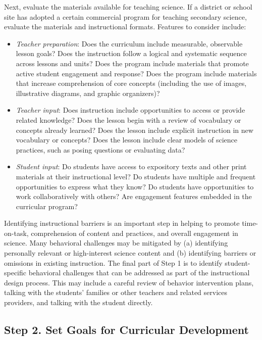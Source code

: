 \documentclass[11.5pt]{sig-alternate} %
\begin{document}
\begin{large}
Next, evaluate the materials available for teaching science. If a district or school site has adopted a certain commercial program for teaching secondary science, evaluate the materials and instructional formats. Features to consider include:
\begin{itemize}
    \item \textit{Teacher preparation}: Does the curriculum include measurable, observable lesson goals? Does the instruction follow a logical and systematic sequence across lessons and units? Does the program include materials that promote active student engagement and response? Does the program include materials that increase comprehension of core concepts (including the use of images, illustrative diagrams, and graphic organizers)?
    \item \textit{Teacher input}: Does instruction include opportunities to access or provide related knowledge? Does the lesson begin with a review of vocabulary or concepts already learned? Does the lesson include explicit instruction in new vocabulary or concepts? Does the lesson include clear models of science practices, such as posing questions or evaluating data?
    \item \textit{Student input}: Do students have access to expository texts and other print materials at their instructional level? Do students have multiple and frequent opportunities to express what they know? Do students have opportunities to work collaboratively with others? Are engagement features embedded in the curricular program?
\end{itemize}

Identifying instructional barriers is an important step in helping to promote time-on-task, comprehension of content and practices, and overall engagement in science. Many behavioral challenges may be mitigated by (a) identifying personally relevant or high-interest science content and (b) identifying barriers or omissions in existing instruction. The final part of Step 1 is to identify student-specific behavioral challenges that can be addressed as part of the instructional design process. This may include a careful review of behavior intervention plans, talking with the students’ families or other teachers and related services providers, and talking with the student directly. 

\subsection*{Step 2. Set Goals for Curricular Development}


\end{large}
\end{document}
